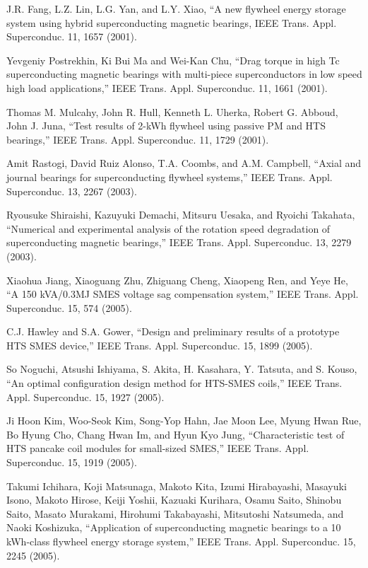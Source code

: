 \noindent [9.87] J.R. Fang, L.Z. Lin, L.G. Yan, and L.Y. Xiao, ``A new flywheel energy storage
system using hybrid superconducting magnetic bearings, IEEE Trans. Appl. Superconduc.
11, 1657 (2001).

\noindent [9.88] Yevgeniy Postrekhin, Ki Bui Ma and Wei-Kan Chu, ``Drag torque in high Tc
superconducting magnetic bearings with multi-piece superconductors in low speed
high load applications,” IEEE Trans. Appl. Superconduc. 11, 1661 (2001).

\noindent [9.89] Thomas M. Mulcahy, John R. Hull, Kenneth L. Uherka, Robert G. Abboud, John
J. Juna, ``Test results of 2-kWh flywheel using passive PM and HTS bearings,”
IEEE Trans. Appl. Superconduc. 11, 1729 (2001).

\noindent [9.90] Amit Rastogi, David Ruiz Alonso, T.A. Coombs, and A.M. Campbell, ``Axial and
journal bearings for superconducting flywheel systems,” IEEE Trans. Appl. Superconduc. 13, 2267 (2003).

\noindent [9.91] Ryousuke Shiraishi, Kazuyuki Demachi, Mitsuru Uesaka, and Ryoichi Takahata,
``Numerical and experimental analysis of the rotation speed degradation of superconducting
magnetic bearings,” IEEE Trans. Appl. Superconduc. 13, 2279 (2003).

\noindent [9.92] Xiaohua Jiang, Xiaoguang Zhu, Zhiguang Cheng, Xiaopeng Ren, and Yeye He,
``A 150 kVA/0.3MJ SMES voltage sag compensation system,” IEEE Trans. Appl.
Superconduc. 15, 574 (2005).

\noindent [9.93] C.J. Hawley and S.A. Gower, ``Design and preliminary results of a prototype HTS
SMES device,” IEEE Trans. Appl. Superconduc. 15, 1899 (2005).

\noindent [9.94] So Noguchi, Atsushi Ishiyama, S. Akita, H. Kasahara, Y. Tatsuta, and S. Kouso,
``An optimal configuration design method for HTS-SMES coils,” IEEE Trans.
Appl. Superconduc. 15, 1927 (2005).

\noindent [9.95] Ji Hoon Kim, Woo-Seok Kim, Song-Yop Hahn, Jae Moon Lee, Myung Hwan Rue,
Bo Hyung Cho, Chang Hwan Im, and Hyun Kyo Jung, ``Characteristic test of HTS
pancake coil modules for small-sized SMES,” IEEE Trans. Appl. Superconduc.
15, 1919 (2005).

\noindent [9.96] Takumi Ichihara, Koji Matsunaga, Makoto Kita, Izumi Hirabayashi, Masayuki
Isono, Makoto Hirose, Keiji Yoshii, Kazuaki Kurihara, Osamu Saito, Shinobu
Saito, Masato Murakami, Hirohumi Takabayashi, Mitsutoshi Natsumeda, and
Naoki Koshizuka, ``Application of superconducting magnetic bearings to a 10
kWh-class flywheel energy storage system,” IEEE Trans. Appl. Superconduc. 15,
2245 (2005).

